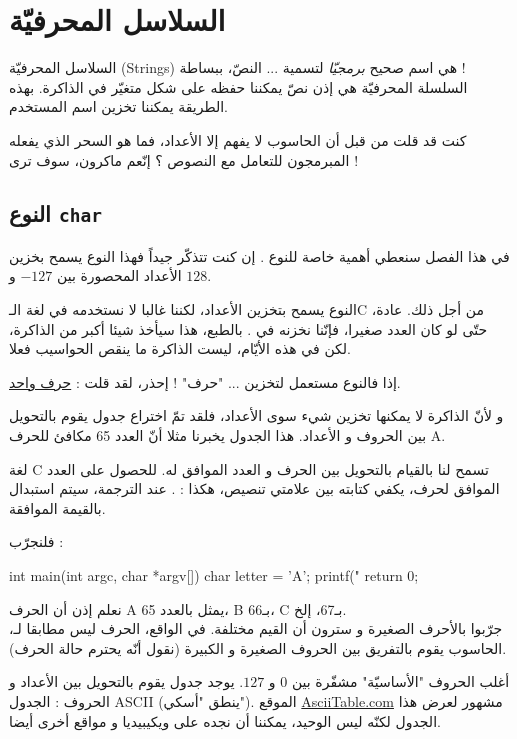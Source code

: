 \chapter{السلاسل المحرفيّة}
السلاسل المحرفيّة (\textenglish{Strings}) هي اسم صحيح
\textit{برمجيّا}
لتسمية ... النصّ، ببساطة !\\
السلسلة المحرفيّة هي إذن نصّ يمكننا حفظه على شكل متغيّر في الذاكرة. بهذه الطريقة يمكننا تخزين اسم المستخدم.

كنت قد قلت من قبل أن الحاسوب لا يفهم إلا الأعداد، فما هو السحر الذي يفعله المبرمجون للتعامل مع النصوص ؟ إنّعم ماكرون، سوف ترى !

\section{النوع \texttt{char}}
في هذا الفصل سنعطي أهمية خاصة للنوع
.
إن كنت تتذكّر جيداً فهذا النوع يسمح بخزين الأعداد المحصورة بين
$-127$
و
$128$.

\begin{information}
  النوع
 يسمح بتخزين الأعداد، لكننا غالبا لا نستخدمه في لغة الـ\textenglish{C}
من أجل ذلك.
عادة، حتّى لو كان العدد صغيرا، فإنّنا نخزنه في
.
بالطبع، هذا سيأخذ  شيئا أكبر من الذاكرة، لكن في هذه الأيّام، ليست الذاكرة ما ينقص الحواسيب فعلا.
\end{information}
إذا فالنوع
مستعمل لتخزين ... "حرف" ! إحذر، لقد قلت :
\underline{حرف واحد}.

و لأنّ الذاكرة لا يمكنها تخزين شيء سوى الأعداد، فلقد تمّ اختراع جدول يقوم بالتحويل بين الحروف و الأعداد. هذا الجدول يخبرنا مثلا أنّ العدد 65 مكافئ للحرف
\textenglish{A}.

لغة
\textenglish{C}
تسمح لنا بالقيام بالتحويل بين الحرف و العدد الموافق له. للحصول على العدد الموافق لحرف، يكفي كتابته بين علامتي تنصيص، هكذا :
.
عند الترجمة، سيتم استبدال
بالقيمة الموافقة.

فلنجرّب :
\begin{Csource}
int main(int argc, char *argv[])
{
	char letter = 'A';
	printf("%
	return 0;
}
\end{Csource}
نعلم إذن أن الحرف
\textenglish{A}
يمثل بالعدد 65،
\textenglish{B}
بـ66،
\textenglish{C}
بـ67، إلخ.\\
جرّبوا بالأحرف الصغيرة و سترون أن القيم مختلفة. في الواقع، الحرف
ليس مطابقا لـ،
الحاسوب يقوم بالتفريق بين الحروف الصغيرة و الكبيرة (نقول أنّه يحترم حالة الحرف).

أغلب الحروف "الأساسيّة" مشفّرة بين $0$ و $127$. يوجد جدول يقوم بالتحويل بين الأعداد و الحروف : الجدول
\textenglish{ASCII}
(ينطق "أسكي"). الموقع
\href{http://www.asciitable.com/}{AsciiTable.com}
مشهور لعرض هذا الجدول لكنّه ليس الوحيد، يمكننا أن نجده على ويكيبيديا و مواقع أخرى أيضا.

